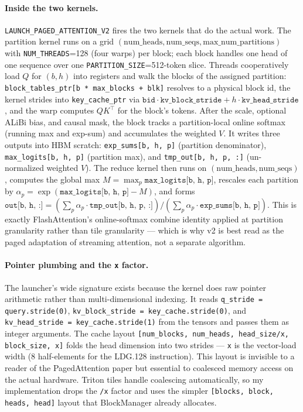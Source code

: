 \documentclass{article}
\begin{document}
\paragraph{Inside the two kernels.} \texttt{LAUNCH\_PAGED\_ATTENTION\_V2} fires the two kernels that do the actual work. The partition kernel runs on a grid $(\text{num\_heads}, \text{num\_seqs}, \text{max\_num\_partitions})$ with \texttt{NUM\_THREADS}=128 (four warps) per block; each block handles one head of one sequence over one \texttt{PARTITION\_SIZE}=512-token slice. Threads cooperatively load $Q$ for $(b, h)$ into registers and walk the blocks of the assigned partition: \texttt{block\_tables\_ptr[b * max\_blocks + blk]} resolves to a physical block id, the kernel strides into \texttt{key\_cache\_ptr} via $\texttt{bid} \cdot \texttt{kv\_block\_stride} + h \cdot \texttt{kv\_head\_stride}$, and the warp computes $Q K^\top$ for the block's tokens. After the scale, optional ALiBi bias, and causal mask, the block tracks a partition-local online softmax (running max and exp-sum) and accumulates the weighted $V$. It writes three outputs into HBM scratch: \texttt{exp\_sums[b, h, p]} (partition denominator), \texttt{max\_logits[b, h, p]} (partition max), and \texttt{tmp\_out[b, h, p, :]} (un-normalized weighted $V$). The reduce kernel then runs on $(\text{num\_heads}, \text{num\_seqs})$, computes the global max $M = \max_p \texttt{max\_logits[b, h, p]}$, rescales each partition by $\alpha_p = \exp(\texttt{max\_logits[b, h, p]} - M)$, and forms $\texttt{out[b, h, :]} = (\sum_p \alpha_p \cdot \texttt{tmp\_out[b, h, p, :]}) / (\sum_p \alpha_p \cdot \texttt{exp\_sums[b, h, p]})$. This is exactly FlashAttention's online-softmax combine identity applied at partition granularity rather than tile granularity --- which is why v2 is best read as the paged adaptation of streaming attention, not a separate algorithm.

\paragraph{Pointer plumbing and the \texttt{x} factor.} The launcher's wide signature exists because the kernel does raw pointer arithmetic rather than multi-dimensional indexing. It reads \texttt{q\_stride = query.stride(0)}, \texttt{kv\_block\_stride = key\_cache.stride(0)}, and \texttt{kv\_head\_stride = key\_cache.stride(1)} from the tensors and passes them as integer arguments. The cache layout \texttt{[num\_blocks, num\_heads, head\_size/x, block\_size, x]} folds the head dimension into two strides --- \texttt{x} is the vector-load width (8 half-elements for the LDG.128 instruction). This layout is invisible to a reader of the PagedAttention paper but essential to coalesced memory access on the actual hardware. Triton tiles handle coalescing automatically, so my implementation drops the \texttt{/x} factor and uses the simpler \texttt{[blocks, block, heads, head]} layout that BlockManager already allocates.
\end{document}
